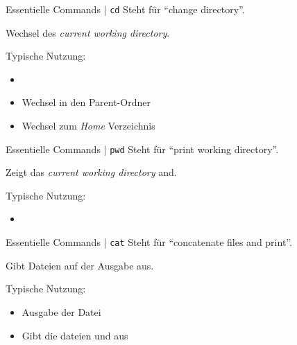 \documentclass{setbeamer}
\begin{document}
\begin{frame}{Essentielle Commands | \texttt{cd}}
    Steht für ``change directory''.

    \vspace{0.3cm}

    Wechsel des \emph{current working directory}.

    \vspace{0.3cm}

    Typische Nutzung:
    \begin{itemize}
        \item {}
        \item {}\textemdash Wechsel in den Parent-Ordner
        \item {}\textemdash Wechsel zum \emph{Home} Verzeichnis
    \end{itemize}
\end{frame}

\begin{frame}{Essentielle Commands | \texttt{pwd}}
    Steht für ``print working directory''.

    \vspace{0.3cm}

    Zeigt das \emph{current working directory} and.

    \vspace{0.3cm}

    Typische Nutzung:
    \begin{itemize}
        \item {}
    \end{itemize}
\end{frame}

\begin{frame}{Essentielle Commands | \texttt{cat}}
    Steht für ``concatenate files and print''.

    \vspace{0.3cm}

    Gibt Dateien auf der Ausgabe aus.

    \vspace{0.3cm}

    Typische Nutzung:
    \begin{itemize}
        \item {}\textemdash Ausgabe der Datei 
        \item {}\textemdash Gibt die dateien  und  aus
    \end{itemize}
\end{frame}
\end{document}
